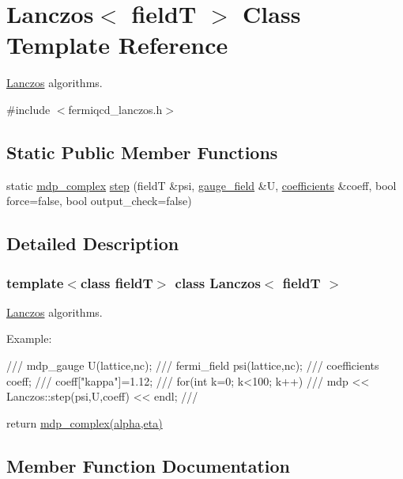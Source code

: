 \hypertarget{class_lanczos}{}\section{Lanczos$<$ fieldT $>$ Class Template Reference}
\label{class_lanczos}


\hyperlink{class_lanczos}{Lanczos} algorithms.  




{\ttfamily \#include $<$fermiqcd\+\_\+lanczos.\+h$>$}

\subsection*{Static Public Member Functions}
\begin{DoxyCompactItemize}
\item 
static \hyperlink{classmdp__complex}{mdp\+\_\+complex} \hyperlink{class_lanczos_a955801bdbd7665b16d35b60de725636e}{step} (fieldT \&psi, \hyperlink{classgauge__field}{gauge\+\_\+field} \&U, \hyperlink{classcoefficients}{coefficients} \&coeff, bool force=false, bool output\+\_\+check=false)
\end{DoxyCompactItemize}


\subsection{Detailed Description}
\subsubsection*{template$<$class fieldT$>$\newline
class Lanczos$<$ field\+T $>$}

\hyperlink{class_lanczos}{Lanczos} algorithms. 

Example\+: \begin{DoxyVerb}/// mdp_gauge U(lattice,nc);
/// fermi_field psi(lattice,nc);
/// coefficients coeff;
/// coeff["kappa"]=1.12;
/// for(int k=0; k<100; k++)
///    mdp << Lanczos::step(psi,U,coeff) << endl;
/// \end{DoxyVerb}
 return \hyperlink{classmdp__complex}{mdp\+\_\+complex(alpha,eta)} 

\subsection{Member Function Documentation}
\mbox{\label{class_lanczos_a955801bdbd7665b16d35b60de725636e}} 
